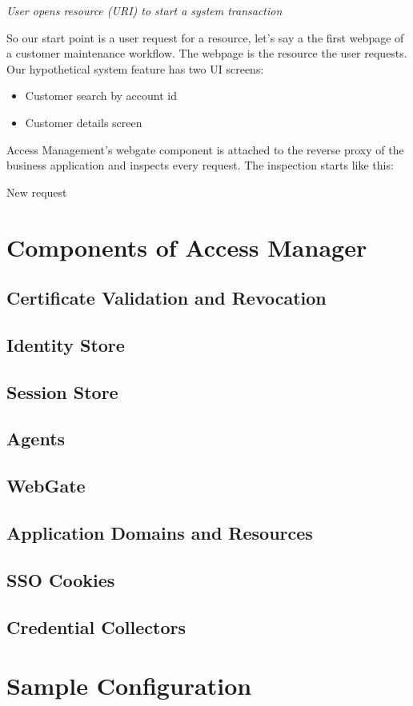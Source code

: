\emph{User opens resource (URI) to start a system transaction}

So our start point is a user request for a resource, let's say a the first webpage of a customer maintenance workflow. The webpage is the resource the user requests. Our hypothetical system feature has two UI screens:

\begin{itemize}
    \item Customer search by account id
    \item Customer details screen
\end{itemize}

Access Management's webgate component is attached to the reverse proxy of the business application and inspects every request. The inspection starts like this:

New request 

\chapter{Components of Access Manager}

\section{Certificate Validation and Revocation}

\section{Identity Store}

\section{Session Store}

\section{Agents}

\section{WebGate}

\section{Application Domains and Resources}

\section{SSO Cookies}

\section{Credential Collectors}



\chapter{Sample Configuration}

